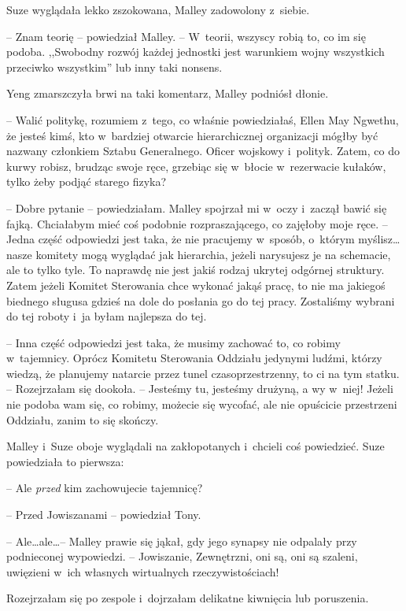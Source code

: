 \documentclass[oneside,polish,11pt,sfheadings]{mwbk}
\begin{document}
Suze wyglądała lekko zszokowana, Malley zadowolony z~siebie.

-- Znam teorię -- powiedział Malley. -- W~teorii, wszyscy robią to, co im
się podoba. ,,Swobodny rozwój każdej jednostki jest warunkiem wojny
wszystkich przeciwko wszystkim'' lub inny taki nonsens.

Yeng zmarszczyła brwi na taki komentarz, Malley podniósł dłonie. 

-- Walić
politykę, rozumiem z~tego, co właśnie powiedziałaś, Ellen May Ngwethu,
że jesteś kimś, kto w~bardziej otwarcie hierarchicznej organizacji
mógłby być nazwany członkiem Sztabu Generalnego. Oficer wojskowy i~polityk. Zatem, co do kurwy robisz, brudząc swoje ręce, grzebiąc się w~błocie w~rezerwacie kułaków, tylko żeby podjąć starego fizyka?

-- Dobre pytanie -- powiedziałam. Malley spojrzał mi w~oczy i~zaczął bawić
się fajką. Chciałabym mieć coś podobnie rozpraszającego, co zajęłoby
moje ręce. -- Jedna część odpowiedzi jest taka, że nie pracujemy w~sposób, o~którym myślisz\ldots  nasze komitety mogą wyglądać jak hierarchia,
jeżeli narysujesz je na schemacie, ale to tylko tyle. To naprawdę nie
jest jakiś rodzaj ukrytej odgórnej struktury. Zatem jeżeli Komitet
Sterowania chce wykonać jakąś pracę, to nie ma jakiegoś biednego sługusa
gdzieś na dole do posłania go do tej pracy. Zostaliśmy wybrani do tej
roboty i~ja byłam najlepsza do tej.

-- Inna część odpowiedzi jest taka, że musimy zachować to, co robimy w~tajemnicy. Oprócz Komitetu Sterowania Oddziału jedynymi ludźmi, którzy
wiedzą, że planujemy natarcie przez tunel czasoprzestrzenny, to ci na
tym statku. -- Rozejrzałam się dookoła. -- Jesteśmy tu, jesteśmy drużyną,
a wy w~niej! Jeżeli nie podoba wam się, co robimy, możecie się wycofać,
ale nie opuścicie przestrzeni Oddziału, zanim to się skończy.

Malley i~Suze oboje wyglądali na zakłopotanych i~chcieli coś powiedzieć.
Suze powiedziała to pierwsza: 

-- Ale \textit{przed} kim zachowujecie
tajemnicę?

-- Przed Jowiszanami -- powiedział Tony.

-- Ale\ldots  ale\ldots  -- Malley prawie się jąkał, gdy jego synapsy nie odpalały
przy podnieconej wypowiedzi. -- Jowiszanie, Zewnętrzni, oni są, oni są
szaleni, uwięzieni w~ich własnych wirtualnych rzeczywistościach!

Rozejrzałam się po zespole i~dojrzałam delikatne kiwnięcia lub
poruszenia.
\end{document}
